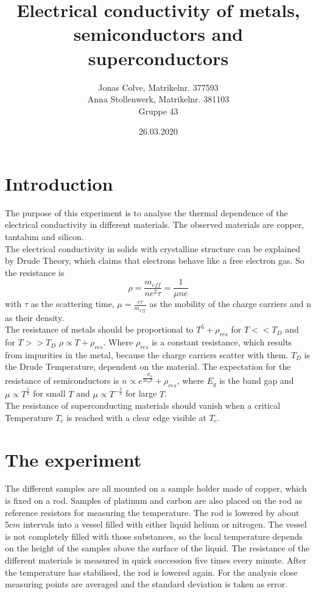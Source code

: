 \documentclass{article}
\title{\huge Electrical conductivity of metals, semiconductors and superconductors}
\author{\Large Jonas Colve, Matrikelnr. 377593\\ \Large Anna Stollenwerk, Matrikelnr. 381103 \\Gruppe 43}
\date{26.03.2020}
\begin{document}
\renewcommand{\figurename}{fig.}
\renewcommand{\tablename}{tab.}

\maketitle
\newpage



\tableofcontents

\newpage

\section{Introduction}
The purpose of this experiment is to analyse the thermal dependence of the electrical conductivity in different materials.
The observed materials are copper, tantalum and silicon.\\
The electrical conductivity in solids with crystalline structure can be explained by Drude Theory, which claims that electrons behave like a free electron gas.
So the resistance is
\begin{equation*}
    \rho = \frac{m_{eff}}{n e^2\tau} = \frac{1}{\mu n e}
\end{equation*}
with $\tau$ as the scattering time, $\mu = \frac{e \tau}{m_{eff}}$ as the mobility of the charge carriers and n as their density.\\
The resistance of metals should be proportional to $T^5 + \rho_{res}$ for $T<< T_{D}$ and for $T>> T_{D}$ $\rho \propto T+\rho_{res}$. Where $\rho_{res}$ is a constant resistance, which results from impurities in the metal, because the charge carriers scatter with them. $T_D$ is the Drude Temperature, dependent on the material.
The expectation for the resistance of semiconductors is $n \propto e^{\frac{-E_g}{2 k_B T}} + \rho_{res}$, where $E_g$ is the band gap and $\mu \propto T^\frac{3}{2}$ for small $T$ and $\mu \propto T^{-\frac{3}{2}}$ for large $T$.\\
The resistance of superconducting materials should vanish when a critical Temperature $T_c$ is reached with a clear edge visible at $T_c$.

\section{The experiment}
The different samples are all mounted on a sample holder made of copper, which is fixed on a rod.
Samples of platinum and carbon are also placed on the rod as reference resistors for measuring the temperature.
The rod is lowered by about $5cm$ intervals into a vessel filled with either liquid helium or nitrogen.
The vessel is not completely filled with those substances, so the local temperature depends on the height of the samples above the surface of the liquid.
The resistance of the different materials is measured in quick succession five times every minute. After the temperature has stabilised, the rod is lowered again.
For the analysis close measuring points are averaged and the standard deviation is taken as error.
\end{document}
